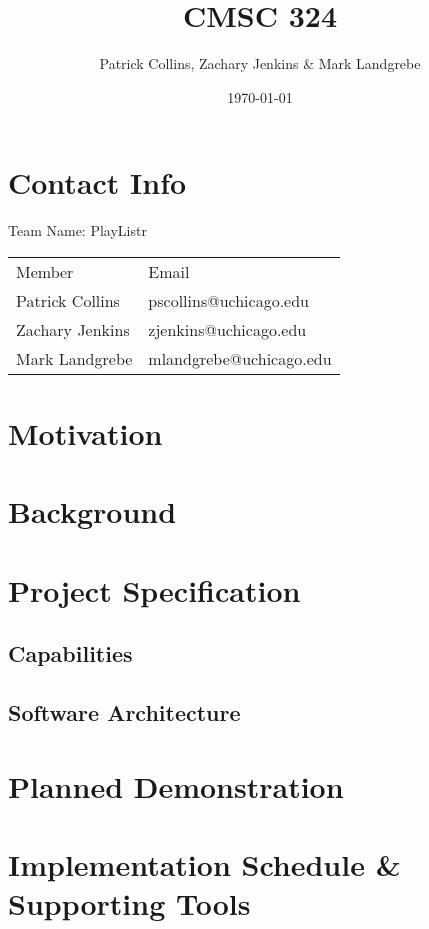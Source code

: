 \documentclass[12pt]{article}
\begin{document}
\title{CMSC 324}
\author{Patrick Collins, Zachary Jenkins \& Mark Landgrebe}
\date{\today}
\maketitle
\pagebreak

\section{Contact Info}
Team Name: PlayListr

\begin{center}
\begin{tabular}{l|l}
 Member           &  Email                   \hline \\
 Patrick Collins  &  pscollins@uchicago.edu   \\
 Zachary Jenkins  &  zjenkins@uchicago.edu    \\
 Mark Landgrebe   &  mlandgrebe@uchicago.edu  \\
\end{tabular}
\end{center}

\pagebreak

\section{Motivation}

\pagebreak
\section{Background}

\pagebreak

\section{Project Specification}

\subsection{Capabilities}

\subsection{Software Architecture}

\pagebreak

\section{Planned Demonstration}

\pagebreak

\section{Implementation Schedule \& Supporting Tools}
\end{document}
